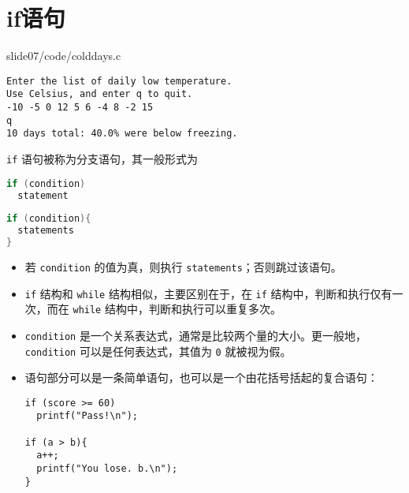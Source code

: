 \section{if语句}

\begin{frame}\ft{\secname}

{slide07/code/colddays.c}
\end{frame}


\begin{frame}[fragile]\ft{\secname}
\begin{lstlisting}[backgroundcolor=\color{red!10}]
Enter the list of daily low temperature.
Use Celsius, and enter q to quit.
-10 -5 0 12 5 6 -4 8 -2 15
q
10 days total: 40.0% were below freezing.
\end{lstlisting}
\end{frame}

\begin{frame}[fragile]\ft{\secname}
\lstinline|if| 语句被称为分支语句，其一般形式为
\begin{lstlisting}[language=c]
if (condition)
  statement
  
if (condition){
  statements
}  
\end{lstlisting}
\begin{itemize}
\item
若 \lstinline|condition| 的值为真，则执行 \lstinline|statements|；否则跳过该语句。\\[0.1in]
\item
\lstinline|if| 结构和 \lstinline|while| 结构相似，主要区别在于，在 \lstinline|if| 结构中，判断和执行仅有一次，而在 \lstinline|while| 结构中，判断和执行可以重复多次。
\end{itemize}
\end{frame}

\begin{frame}[fragile]\ft{\secname}
\begin{itemize}
\item
\lstinline|condition| 是一个关系表达式，通常是比较两个量的大小。更一般地，\lstinline|condition| 可以是任何表达式，其值为 \lstinline|0| 就被视为假。\\[0.1in]
\item
语句部分可以是一条简单语句，也可以是一个由花括号括起的复合语句：
\begin{lstlisting}[]
if (score >= 60)
  printf("Pass!\n");
  
if (a > b){
  a++;
  printf("You lose. b.\n");
}  
\end{lstlisting}
\end{itemize}

\end{frame}
